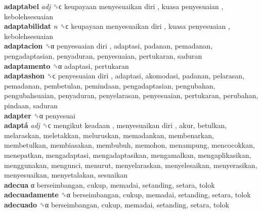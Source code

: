 \textbf{adaptabel} \emph{adj}  ␝ϲ   keupayaan menyesuaikan diri ,  kuasa penyesuaian , kebolehsesuaian  \\
\textbf{adaptabilidat} \emph{n}  ␝ϲ   keupayaan menyesuaikan diri ,  kuasa penyesuaian , kebolehsesuaian  \\
\textbf{adaptacion} ␝α   penyesuaian diri , adaptasi, padanan, pemadanan, pengadaptasian, penyaduran, penyesuaian, pertukaran, saduran  \\
\textbf{adaptamento} ␝α  adaptasi, pertukaran  \\
\textbf{adaptashon} ␝ϲ   penyesuaian diri , adaptasi, akomodasi, padanan, pelarasan, pemadanan, pembetulan, pemindaan, pengadaptasian, pengubahan, pengubahsuaian, penyaduran, penyelarasan, penyesuaian, pertukaran, perubahan, pindaan, saduran  \\
\textbf{adapter} ␝α  penyesuai  \\
\textbf{adaptá} \emph{adj}  ␝ϲ   mengikut keadaan ,  menyesuaikan diri , akur, betulkan, melaraskan, meletakkan, meluruskan, memadankan, membenarkan, membetulkan, membiasakan, membubuh, memohon, menampung, mencocokkan, menepatkan, mengadaptasi, mengadaptasikan, mengamalkan, mengaplikasikan, menggunakan, mengunci, menurut, menyelaraskan, menyelesaikan, menyerasikan, menyesuaikan, menyetalakan, sesuaikan  \\
\textbf{adecua} α  berseimbangan, cukup, memadai, setanding, setara, tolok  \\
\textbf{adecuadamente} ␝α  berseimbangan, cukup, memadai, setanding, setara, tolok  \\
\textbf{adecuado} ␝α  berseimbangan, cukup, memadai, setanding, setara, tolok  \\
